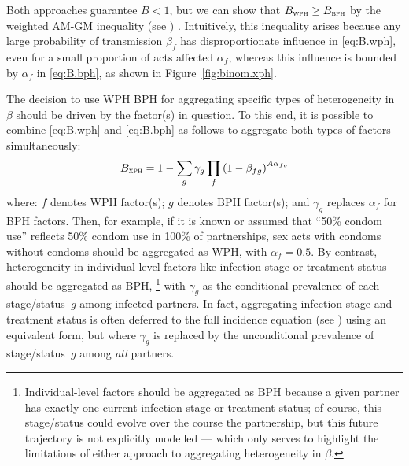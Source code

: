 Both approaches guarantee $B < 1$,
but we can show that $B_{\textsc{wph}} \ge B_{\textsc{bph}}$
by the weighted AM-GM inequality (see ) \cite{Aldaz2009}.
Intuitively, this inequality arises because
any large probability of transmission $\beta_f$
has disproportionate influence in \eqref{eq:B.wph},
even for a small proportion of acts affected $\alpha_f$,
whereas this influence is bounded by $\alpha_f$ in \eqref{eq:B.bph},
as shown in Figure~\ref{fig:binom.xph}.
\par
The decision to use WPH \vs BPH for aggregating specific types of heterogeneity in $\beta$
should be driven by the factor(s) in question.
To this end, it is possible to combine \eqref{eq:B.wph} and \eqref{eq:B.bph} as follows
to aggregate both types of factors simultaneously:
\begin{equation}\label{eq:B.xph}
  B_{\textsc{xph}} = 1 - \sum_g \gamma_g \prod_f {(1 - \beta_{fg})}^{A\alpha_{fg}}
\end{equation} where:
$f$ denotes WPH factor(s);
$g$ denotes BPH factor(s); and
$\gamma_g$ replaces $\alpha_f$ for BPH factors.
Then, for example, if it is known or assumed that
``50\% condom use'' reflects 50\% condom use in 100\% of partnerships,
sex acts with condoms \vs without condoms
should be aggregated as WPH, with $\alpha_f = 0.5$.
By contrast, heterogeneity in individual-level factors like infection stage or treatment status
should be aggregated as BPH,%
\footnote{\label{foot:xph.future}
  Individual-level factors should be aggregated as BPH because
  a given partner has exactly one current infection stage or treatment status;
  of course, this stage/status could evolve over the course the partnership,
  but this future trajectory is not explicitly modelled
  --- which only serves to highlight the limitations of
  either approach to aggregating heterogeneity in $\beta$.}
with $\gamma_g$ as the conditional prevalence of each stage/status~$g$ among infected partners.
In fact, aggregating infection stage and treatment status is often deferred to
the full incidence equation (see ) using an equivalent form,
but where $\gamma_g$ is replaced by
the unconditional prevalence of stage/status~$g$ among \emph{all} partners.
